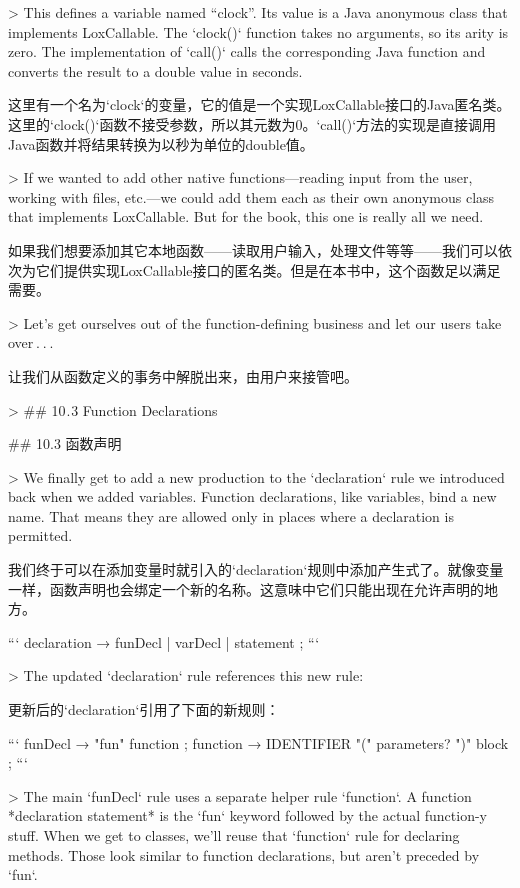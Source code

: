 \documentclass[cn,11pt,chinese]{elegantbook}
\begin{document}
{{{{> This defines a variable named “clock”. Its value is a Java anonymous class that implements LoxCallable. The `clock()` function takes no arguments, so its arity is zero. The implementation of `call()` calls the corresponding Java function and converts the result to a double value in seconds.

这里有一个名为`clock`的变量，它的值是一个实现LoxCallable接口的Java匿名类。这里的`clock()`函数不接受参数，所以其元数为0。`call()`方法的实现是直接调用Java函数并将结果转换为以秒为单位的double值。

> If we wanted to add other native functions—reading input from the user, working with files, etc.—we could add them each as their own anonymous class that implements LoxCallable. But for the book, this one is really all we need.

如果我们想要添加其它本地函数——读取用户输入，处理文件等等——我们可以依次为它们提供实现LoxCallable接口的匿名类。但是在本书中，这个函数足以满足需要。

> Let’s get ourselves out of the function-defining business and let our users take over . . . 

让我们从函数定义的事务中解脱出来，由用户来接管吧。

> ## 10 . 3 Function Declarations

## 10.3 函数声明

> We finally get to add a new production to the `declaration` rule we introduced back when we added variables. Function declarations, like variables, bind a new name. That means they are allowed only in places where a declaration is permitted.

我们终于可以在添加变量时就引入的`declaration`规则中添加产生式了。就像变量一样，函数声明也会绑定一个新的名称。这意味中它们只能出现在允许声明的地方。

```
declaration    → funDecl
               | varDecl
               | statement ;
```

> The updated `declaration` rule references this new rule:

更新后的`declaration`引用了下面的新规则：

```
funDecl        → "fun" function ;
function       → IDENTIFIER "(" parameters? ")" block ;
```

> The main `funDecl` rule uses a separate helper rule `function`. A function *declaration statement* is the `fun` keyword followed by the actual function-y stuff. When we get to classes, we’ll reuse that `function` rule for declaring methods. Those look similar to function declarations, but aren’t preceded by `fun`.

}}}}
\end{document}
